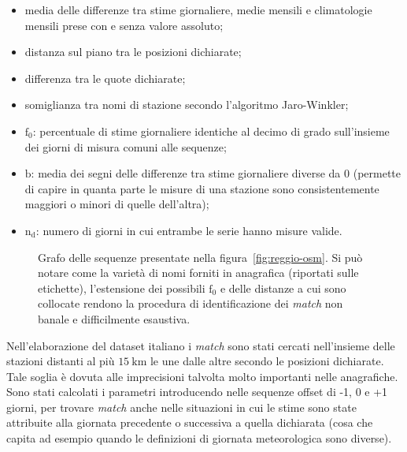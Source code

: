 \begin{itemize}
  \item
    media delle differenze tra stime giornaliere, medie mensili e climatologie mensili prese con e senza valore assoluto;
  \item
    distanza sul piano tra le posizioni dichiarate;
  \item
    differenza tra le quote dichiarate;
  \item
    somiglianza tra nomi di stazione secondo l'algoritmo Jaro-Winkler;
  \item
    \(\mathrm{f}_0\): percentuale di stime giornaliere identiche al decimo di grado sull'insieme dei giorni di misura comuni alle sequenze;
  \item
    \(\mathrm{b}\): media dei segni delle differenze tra stime giornaliere diverse da 0 (permette di capire in quanta parte le misure di una stazione sono consistentemente maggiori o minori di quelle dell'altra);
  \item
    \(\mathrm{n_d}\): numero di giorni in cui entrambe le serie hanno misure valide.
\end{itemize}

\begin{figure}[ht]
  \centering
  \caption{Grafo delle sequenze presentate nella figura~\ref{fig:reggio-osm}. Si può notare come la varietà di nomi forniti in anagrafica (riportati sulle etichette), l'estensione dei possibili \(\mathrm{f}_0\) e delle distanze a cui sono collocate rendono la procedura di identificazione dei \emph{match} non banale e difficilmente esaustiva.}\label{fig:reggio-graph}
\end{figure}

Nell'elaborazione del dataset italiano i \emph{match} sono stati cercati nell'insieme delle stazioni distanti al più \(15\:\mathrm{km}\) le une dalle altre secondo le posizioni dichiarate. Tale soglia è dovuta alle imprecisioni talvolta molto importanti nelle anagrafiche. Sono stati calcolati i parametri introducendo nelle sequenze offset di -1, 0 e +1 giorni, per trovare \emph{match} anche nelle situazioni in cui le stime sono state attribuite alla giornata precedente o successiva a quella dichiarata (cosa che capita ad esempio quando le definizioni di giornata meteorologica sono diverse).

